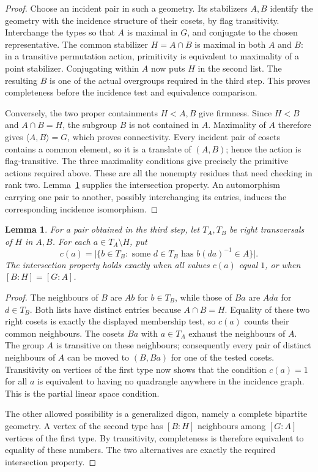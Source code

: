 \documentclass[11pt]{article}
\newtheorem{lemma}[theorem]{Lemma}
\begin{document}
\begin{proof}
Choose an incident pair in such a geometry. Its stabilizers $A,B$ identify
the geometry with the incidence structure of their cosets, by flag
transitivity. Interchange the types so that $A$ is maximal in $G$, and
conjugate to the chosen representative. The common stabilizer $H=A\cap B$
is maximal in both $A$ and $B$: in a transitive permutation action,
primitivity is equivalent to maximality of a point stabilizer. Conjugating
within $A$ now puts $H$ in the second list. The resulting $B$ is one of
the actual overgroups required in the third step. This proves completeness
before the incidence test and equivalence comparison.

Conversely, the two proper containments $H<A,B$ give firmness. Since
$H<B$ and $A\cap B=H$, the subgroup $B$ is not contained in $A$.
Maximality of $A$ therefore gives $\langle A,B\rangle=G$, which proves
connectivity. Every incident pair of cosets contains a common element,
so it is a translate of $(A,B)$; hence the action is flag-transitive.
The three maximality conditions give precisely the primitive actions
required above. These are all the nonempty residues that need checking
in rank two. Lemma~\ref{l:allpairs} supplies the intersection property.
An automorphism carrying one pair to another, possibly interchanging
its entries, induces the corresponding incidence isomorphism.
\end{proof}

\begin{lemma}\label{l:allpairs}
For a pair obtained in the third step, let $T_A,T_B$ be right transversals
of $H$ in $A,B$. For each $a\in T_A\setminus H$, put
\[
 c(a)=\bigl|\{b\in T_B:\text{ some }d\in T_B
                              \text{ has }b(da)^{-1}\in A\}\bigr|.
\]
The intersection property holds exactly when all values $c(a)$ equal $1$,
or when $[B:H]=[G:A]$.
\end{lemma}
\begin{proof}
The neighbours of $B$ are $Ab$ for $b\in T_B$, while those of $Ba$ are
$Ada$ for $d\in T_B$. Both lists have distinct entries because
$A\cap B=H$. Equality of these two right cosets is exactly the displayed
membership test, so $c(a)$ counts their common neighbours. The cosets
$Ba$ with $a\in T_A$ exhaust the neighbours of $A$. The group $A$ is
transitive on these neighbours; consequently every pair of distinct
neighbours of $A$ can be moved to $(B,Ba)$ for one of the tested cosets.
Transitivity on vertices of the first type now shows that the condition
$c(a)=1$ for all $a$ is equivalent to having no quadrangle anywhere in
the incidence graph. This is the partial linear space condition.

The other allowed possibility is a generalized digon, namely a complete
bipartite geometry. A vertex of the second type has $[B:H]$ neighbours
among $[G:A]$ vertices of the first type. By transitivity, completeness
is therefore equivalent to equality of these numbers. The two alternatives
are exactly the required intersection property.
\end{proof}
\end{document}
